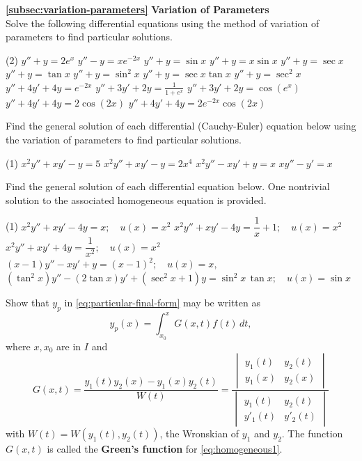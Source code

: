 \begin{Exercise}\label{EX33}
\hspace{-.75ex}\textbf{\ref{subsec:variation-parameters}} \textbf{Variation of Parameters}\\

	\Question\label{3-3-1}
	Solve the following differential equations using the method of variation of parameters
	to find  particular solutions.
	\begin{tasks}(2)
		\task \(y''+y = 2e^x\)
		\task \(y''-y =xe^{-2x}\)
		\task \(y''+y = \sin x\)
		\task \(y''+y = x\sin x\)
		\task \(y''+y = \sec x\)
		\task \(y''+y = \tan x\)
		\task \(y''+y = \sin^2 x\)
		\task \(y''+y = \sec x\tan x\)
		\task \(y''+y = \sec^2 x\)
		\task \(y''+4y'+4y = e^{-2x}\)
		\task \(y''+3y'+2y = \frac{1}{1+e^{x}}\)
		\task \(y''+3y'+2y = \cos(e^x)\)
		\task \(y''+4y'+4y = 2\cos(2x)\)
		\task \(y''+4y'+4y = 2e^{-2x}\cos(2x)\)
	\end{tasks}
	
	\Question\label{3-3-2}
	Find the general solution of each  differential (Cauchy-Euler) equation below using the variation of parameters to find  particular solutions.

	\begin{tasks}(1)
		\task \(x^2y''+xy'-y = 5\)
		\task \(x^2 y''+x y'-y=2 x^4\)
		\task \(x^2 y''-x y'+y=x\)
		\task \(x y''-y'=x\)
	\end{tasks}
\Question\label{3-3-3}
	Find the general solution of each differential equation below. One nontrivial solution to the associated homogeneous equation is provided.
	
	\begin{tasks}(1)
		\task \(x^2 y''+x y'-4 y=x; \quad u(x) = x^2\)
		\task \(x^2 y''+x y'-4  y=\dfrac{1}{x}+1; \quad u(x) = x^2\)
		\task \(x^2 y''+x y'+4  y=\dfrac{1}{x^2};\quad u(x) = x^2 \)
		\task \((x-1)y''-x y'+y=(x-1)^2; \quad u(x) = x, \)
		\task \((\tan^2x)y''-(2 \tan x) y'+ \left(\sec ^2x+1\right)y=\sin^2x \, \tan x; \quad u(x) = \sin x\)
			\end{tasks}
	
	\Question\label{3-3-4}
	Show that  $y_p$ in \eqref{eq:particular-final-form} may be written as 
	\[y_p(x) = \int_{x_0}^x G(x, t)  f(t) \, dt,\]
	where $x, x_0$ are in $I$ and 
	\[G(x, t) = \frac{y_1(t) y_2(x) - y_1(x) y_2(t)}{W(t)}=\frac{\begin{vmatrix}
			y_1(t)&y_2(t)\\
			y_1(x)&y_2(x)
	\end{vmatrix}}{\begin{vmatrix}
	y_1(t)&y_2(t)\\
	y'_1(t)&y'_2(t)
\end{vmatrix}}\] with $W(t) = W(y_1(t), y_2(t))$, the Wronskian of $y_1$ and $y_2$. The function $G(x, t)$ is called the \textbf{Green's function}  for  \eqref{eq:homogeneous1}.



\end{Exercise}
